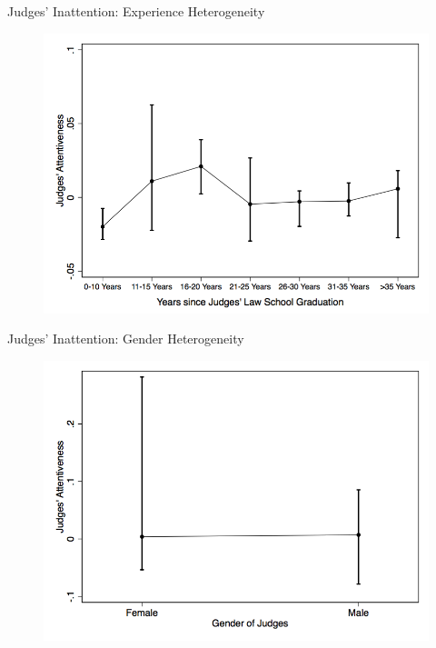 \begin{frame}{Judges' Inattention: Experience Heterogeneity}
    \begin{figure}
        \centering
        \includegraphics[height = 0.7 \textheight]{images/attent_bylschyr_mean.png}
    \end{figure}
\end{frame}

\begin{frame}{Judges' Inattention: Gender Heterogeneity}
    \begin{figure}
        \centering
        \includegraphics[height = 0.7 \textheight]{images/attent_bygender.png}
    \end{figure}
\end{frame}

